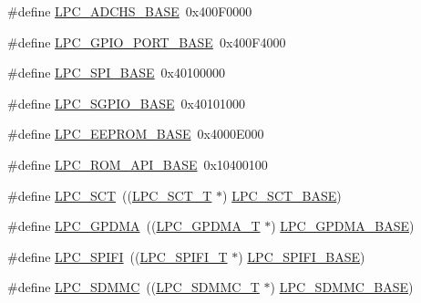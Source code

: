 \begin{DoxyCompactItemize}
\#define \hyperlink{group___p_e_r_i_p_h__43_x_x___b_a_s_e_gabecd591c7e203c132a20798f724c6ed6}{L\+P\+C\+\_\+\+A\+D\+C\+H\+S\+\_\+\+B\+A\+SE}~0x400\+F0000
\item 
\#define \hyperlink{group___p_e_r_i_p_h__43_x_x___b_a_s_e_ga7de0e57c07a6bd4ff8cf9f2b85249ed4}{L\+P\+C\+\_\+\+G\+P\+I\+O\+\_\+\+P\+O\+R\+T\+\_\+\+B\+A\+SE}~0x400\+F4000
\item 
\#define \hyperlink{group___p_e_r_i_p_h__43_x_x___b_a_s_e_gaf611188188574ba805b6de71acc88c6c}{L\+P\+C\+\_\+\+S\+P\+I\+\_\+\+B\+A\+SE}~0x40100000
\item 
\#define \hyperlink{group___p_e_r_i_p_h__43_x_x___b_a_s_e_ga3e50d6c46ad4612cde93035a12b204a8}{L\+P\+C\+\_\+\+S\+G\+P\+I\+O\+\_\+\+B\+A\+SE}~0x40101000
\item 
\#define \hyperlink{group___p_e_r_i_p_h__43_x_x___b_a_s_e_ga9d1fcaafb9feb0f8253c3cef1edc7e9f}{L\+P\+C\+\_\+\+E\+E\+P\+R\+O\+M\+\_\+\+B\+A\+SE}~0x4000\+E000
\item 
\#define \hyperlink{group___p_e_r_i_p_h__43_x_x___b_a_s_e_ga2ae00d891b7603694f3a1eb640013f63}{L\+P\+C\+\_\+\+R\+O\+M\+\_\+\+A\+P\+I\+\_\+\+B\+A\+SE}~0x10400100
\item 
\#define \hyperlink{group___p_e_r_i_p_h__43_x_x___b_a_s_e_gace25d349a4ffff2cd63e5f2c6d127509}{L\+P\+C\+\_\+\+S\+CT}~((\hyperlink{struct_l_p_c___s_c_t___t}{L\+P\+C\+\_\+\+S\+C\+T\+\_\+T}              $\ast$) \hyperlink{group___p_e_r_i_p_h__43_x_x___b_a_s_e_gad39ca0e94488b4bee5510b2e8bc5a708}{L\+P\+C\+\_\+\+S\+C\+T\+\_\+\+B\+A\+SE})
\item 
\#define \hyperlink{group___p_e_r_i_p_h__43_x_x___b_a_s_e_gaf9d4b843ddff8d08a27880f90e2dbf18}{L\+P\+C\+\_\+\+G\+P\+D\+MA}~((\hyperlink{struct_l_p_c___g_p_d_m_a___t}{L\+P\+C\+\_\+\+G\+P\+D\+M\+A\+\_\+T}            $\ast$) \hyperlink{group___p_e_r_i_p_h__43_x_x___b_a_s_e_ga51ba8e3f33730fa2b78be3f892d8c278}{L\+P\+C\+\_\+\+G\+P\+D\+M\+A\+\_\+\+B\+A\+SE})
\item 
\#define \hyperlink{group___p_e_r_i_p_h__43_x_x___b_a_s_e_gaa6445e9b3756a585e42bb068a305f879}{L\+P\+C\+\_\+\+S\+P\+I\+FI}~((\hyperlink{group___l_p_c_s_p_i_f_i_l_i_b___h_w___a_p_i_ga69ca4e6bace5ac7e7a2ae3cdc0d569b3}{L\+P\+C\+\_\+\+S\+P\+I\+F\+I\+\_\+T}            $\ast$) \hyperlink{group___p_e_r_i_p_h__43_x_x___b_a_s_e_gad284a5971366e0a8b5fe9881fdb9aa0c}{L\+P\+C\+\_\+\+S\+P\+I\+F\+I\+\_\+\+B\+A\+SE})
\item 
\#define \hyperlink{group___p_e_r_i_p_h__43_x_x___b_a_s_e_ga0dad86ccae5b13170e0204ed651a2847}{L\+P\+C\+\_\+\+S\+D\+M\+MC}~((\hyperlink{struct_l_p_c___s_d_m_m_c___t}{L\+P\+C\+\_\+\+S\+D\+M\+M\+C\+\_\+T}            $\ast$) \hyperlink{group___p_e_r_i_p_h__43_x_x___b_a_s_e_ga4175c6e418d0b209c42f789cfa9ff32b}{L\+P\+C\+\_\+\+S\+D\+M\+M\+C\+\_\+\+B\+A\+SE})

\end{DoxyCompactItemize}
